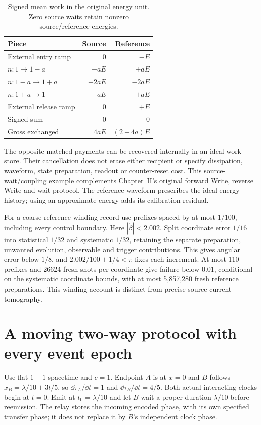 \begin{table}[htbp]\centering\small
\caption{Signed mean work in the original energy unit. Zero source waits retain nonzero source/reference energies.}\label{tab:switching-work}
\begin{tabular}{@{}lrr@{}}\toprule
Piece&Source&Reference\\\midrule
External entry ramp&$0$&$-E$\\
$n:1\to1-a$&$-aE$&$+aE$\\
$n:1-a\to1+a$&$+2aE$&$-2aE$\\
$n:1+a\to1$&$-aE$&$+aE$\\
External release ramp&$0$&$+E$\\\midrule
Signed sum&$0$&$0$\\
Gross exchanged&$4aE$&$(2+4a)E$\\\bottomrule
\end{tabular}\end{table}

The opposite matched payments can be recovered internally in an ideal work store. Their cancellation does not erase either recipient or specify dissipation, waveform, state preparation, readout or counter-reset cost. This source-wait/coupling example complements Chapter~II's original forward Write, reverse Write and wait protocol. The reference waveform prescribes the ideal energy history; using an approximate energy adds its calibration residual.

For a coarse reference winding record use prefixes spaced by at most $1/100$, including every control boundary. Here $|\dot\beta|<2.002$. Split coordinate error $1/16$ into statistical $1/32$ and systematic $1/32$, retaining the separate preparation, unwanted evolution, observable and trigger contributions. This gives angular error below $1/8$, and $2.002/100+1/4<\pi$ fixes each increment. At most 110 prefixes and 26624 fresh shots per coordinate give failure below $0.01$, conditional on the systematic coordinate bounds, with at most 5,857,280 fresh reference preparations. This winding account is distinct from precise source-current tomography.

\section{A moving two-way protocol with every event epoch}\label{sec:moving-two-way}
Use flat $1+1$ spacetime and $c=1$. Endpoint $A$ is at $x=0$ and $B$ follows $x_B=\lambda/10+3t/5$, so $\dd\tau_A/\dd t=1$ and $\dd\tau_B/\dd t=4/5$. Both actual interacting clocks begin at $t=0$. Emit at $t_0=\lambda/10$ and let $B$ wait a proper duration $\lambda/10$ before reemission. The relay stores the incoming encoded phase, with its own specified transfer phase; it does not replace it by $B$'s independent clock phase.

